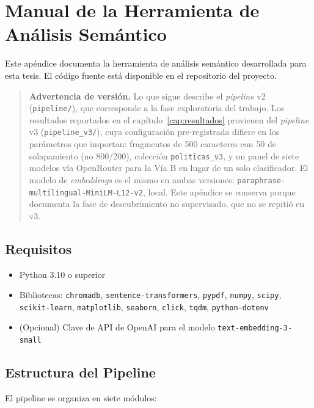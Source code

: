 \chapter{Manual de la Herramienta de Análisis Semántico}
\label{ap:herramienta}

Este apéndice documenta la herramienta de análisis semántico desarrollada para esta tesis. El código fuente está disponible en el repositorio del proyecto.

\begin{quote}
\small\textbf{Advertencia de versión.} Lo que sigue describe el \emph{pipeline} v2 (\texttt{pipeline/}), que corresponde a la fase exploratoria del trabajo. Los resultados reportados en el capítulo~\ref{cap:resultados} provienen del \emph{pipeline} v3 (\texttt{pipeline\_v3/}), cuya configuración pre-registrada difiere en los parámetros que importan: fragmentos de 500 caracteres con 50 de solapamiento (no 800/200), colección \texttt{politicas\_v3}, y un panel de siete modelos vía OpenRouter para la Vía B en lugar de un solo clasificador. El modelo de \emph{embeddings} es el mismo en ambas versiones: \texttt{paraphrase-multilingual-MiniLM-L12-v2}, local. Este apéndice se conserva porque documenta la fase de descubrimiento no supervisado, que no se repitió en v3.
\end{quote}

\section{Requisitos}

\begin{itemize}
\item Python 3.10 o superior
\item Bibliotecas: \texttt{chromadb}, \texttt{sentence-transformers}, \texttt{pypdf}, \texttt{numpy}, \texttt{scipy}, \texttt{scikit-learn}, \texttt{matplotlib}, \texttt{seaborn}, \texttt{click}, \texttt{tqdm}, \texttt{python-dotenv}
\item (Opcional) Clave de API de OpenAI para el modelo \texttt{text-embedding-3-small}
\end{itemize}

\section{Estructura del Pipeline}

El pipeline se organiza en siete módulos:

